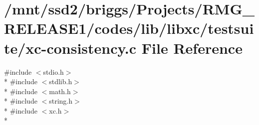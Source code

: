 \hypertarget{xc-consistency_8c}{\section{/mnt/ssd2/briggs/\-Projects/\-R\-M\-G\-\_\-\-R\-E\-L\-E\-A\-S\-E1/codes/lib/libxc/testsuite/xc-\/consistency.c File Reference}
\label{xc-consistency_8c}
}
{\ttfamily \#include $<$stdio.\-h$>$}\\*
{\ttfamily \#include $<$stdlib.\-h$>$}\\*
{\ttfamily \#include $<$math.\-h$>$}\\*
{\ttfamily \#include $<$string.\-h$>$}\\*
{\ttfamily \#include $<$xc.\-h$>$}\\*
